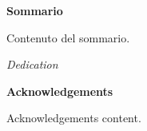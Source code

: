 \documentclass[a4paper, 12pt, twosided]{Thesis}  %
\begin{document}
\pagestyle{empty}  %
\cleardoublepage
\pagestyle{plain}

\newpage
\thispagestyle{empty}
\mbox{}


\pagestyle{empty}
  \null\vspace{3cm}
  \begin{center}
    \setlength{\parskip}{0pt}
    {\huge{{\textbf{Sommario}}} \par}
        \bigskip
        \end{center}
Contenuto del sommario.



\newpage
\thispagestyle{empty}
\mbox{}


\newpage
\thispagestyle{empty}
\mbox{}

\vspace*{4cm}
\begin{flushright}
	\textit{\Large{{Dedication}}}
\end{flushright}
\vspace*{\fill}


\newpage
\thispagestyle{empty}
\mbox{}

\newpage
\thispagestyle{empty}
\mbox{}

\thispagestyle{empty}

  \begin{center}
    \setlength{\parskip}{0pt}
    {\huge{\textbf{Acknowledgements}} \par}
        \bigskip
        \end{center}
{ Acknowledgements content.}


\newpage
\thispagestyle{empty}
\mbox{}


\fancyhead[LE]{\thepage}

\pagestyle{fancy}  %

\tableofcontents  %
\newpage
\thispagestyle{empty}
\mbox{}

\end{document}
